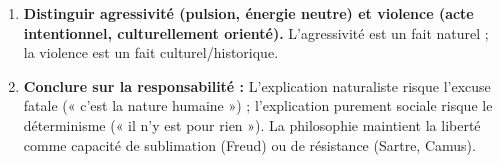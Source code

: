 \documentclass[11pt]{article}
\newcommand{\cle}[1]{{\popxbold\color{popdark}#1}}
\begin{document}
\begin{methode}
\begin{enumerate}
\begin{itemize}
            \item Niveau 4 : \textbf{Structure sociale} (injustice, chômage, État failli, colonialité du pouvoir — Fanon : \guillemotleft La violence est une force nettoyeuse \guillemotright pour le colonisé aliéné).
        \end{itemize}
    \item \textbf{Distinguir \cle{agressivité} (pulsion, énergie neutre) et \cle{violence} (acte intentionnel, culturellement orienté).} L'agressivité est un \cle{fait naturel} ; la violence est un \cle{fait culturel/historique}.
    \item \textbf{Conclure sur la responsabilité :} L'explication naturaliste risque l'excuse fatale (« c'est la nature humaine ») ; l'explication purement sociale risque le déterminisme (« il n'y est pour rien »). La philosophie maintient la \cle{liberté} comme capacité de sublimation (Freud) ou de résistance (Sartre, Camus).
\end{enumerate}
\end{methode}
\end{document}
